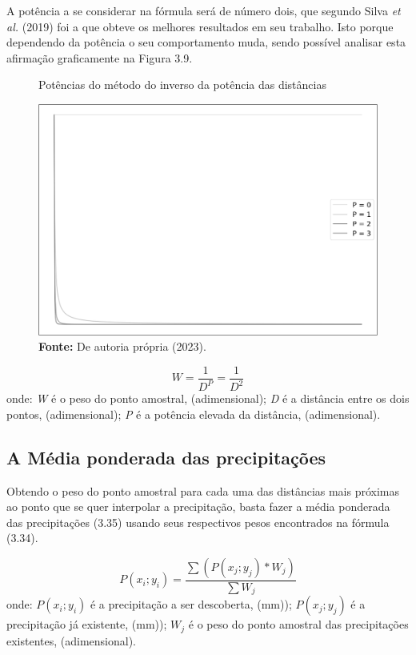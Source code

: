 A potência a se considerar na fórmula será de número dois, que segundo Silva \textit{et al.} (2019) foi a que obteve os melhores resultados em seu trabalho. Isto porque dependendo da potência o seu comportamento muda, sendo possível analisar esta afirmação graficamente na Figura 3.9.

\newpage

\begin{figure}[!ht]
	\centering
	\caption{Potências do método do inverso da potência das distâncias}
	\includegraphics[width=.7325\linewidth]{figuras/potencias_da_idw.png}
	\caption*{\textbf{Fonte:} De autoria própria (2023).}
	\label{fig:potencias_da_idw.png}
\end{figure}

\begin{equation}
W = \frac{1}{D^P} = \frac{1}{D^2}
\end{equation}
\newline
onde:
\newline
\textit{W} é o peso do ponto amostral, (adimensional);
\newline
\textit{D} é a distância entre os dois pontos, (adimensional);
\newline
\textit{P} é a potência elevada da distância, (adimensional).\bigskip

\subsection{A Média ponderada das precipitações}\bigskip

Obtendo o peso do ponto amostral para cada uma das distâncias mais próximas ao ponto que se quer interpolar a precipitação, basta fazer a média ponderada das precipitações (3.35) usando seus respectivos pesos encontrados na fórmula (3.34).\bigskip

\begin{equation}
P(x_i ; y_i) = \frac{\sum{\left(P(x_j ; y_j) * W_j\right)}}{\sum{W_j}}
\end{equation}
\newline
onde:
\newline
$P(x_i ; y_i)$ é a precipitação a ser descoberta, (mm));
\newline
$P(x_j ; y_j)$ é a precipitação já existente, (mm));
\newline
$W_j$ é o peso do ponto amostral das precipitações existentes, (adimensional).\bigskip